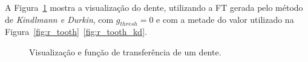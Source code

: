 	A Figura~\ref{fig:r_toothx_kd} mostra a visualização do dente, utilizando a FT gerada pelo método de \textit{Kindlmann e Durkin}, com $ g_{thresh} = 0 $ e com a metade do valor utilizado na Figura~\ref{fig:r_tooth}~\ref{fig:r_tooth_kd}.

\begin{figure}[h]
	\centering
	\caption{Visualização e função de transferência de um dente.}
	\label{fig:r_toothx_kd}
\end{figure}

